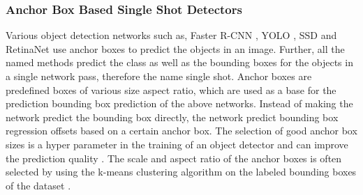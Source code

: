 




\subsubsection{Anchor Box Based Single Shot Detectors}

Various object detection networks such as, Faster \ac{R-CNN} \cite{faster_rcnn}, \ac{YOLO} \cite{yolov1}, \ac{SSD} \cite{ssd} and RetinaNet \cite{focalloss} use anchor boxes to predict the objects in an image.
Further, all the named methods predict the class as well as the bounding boxes for the objects in a single network pass, therefore the name single shot.
Anchor boxes are predefined boxes of various size aspect ratio, which are used as a base for the prediction bounding box prediction of the above networks.
Instead of making the network predict the bounding box directly, the network predict bounding box regression offsets based on a certain anchor box. \cite{yolov3}
The selection of good anchor box sizes is a hyper parameter in the training of an object detector and can improve the prediction quality \cite{faster_rcnn}.
The scale and aspect ratio of the anchor boxes is often selected by using the k-means clustering algorithm on the labeled bounding boxes of the dataset \cite{yolov2}.


